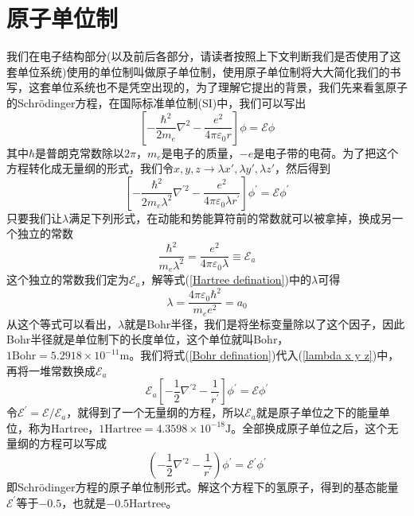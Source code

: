 \documentclass[12pt,a4paper,openany,twoside]{book}
\numberwithin{equation}{section}
\newcommand{\sch}{Schr\"odinger}
\begin{document}
      \section{原子单位制}
        我们在电子结构部分(以及前后各部分，请读者按照上下文判断我们是否使用了这套单位系统)使用的单位制叫做原子单位制，使用原子单位制将大大简化我们的书写，这套单位系统也不是凭空出现的，为了理解它提出的背景，我们先来看氢原子的\sch 方程，在国际标准单位制(SI)中，我们可以写出
        \begin{equation}
          \left[ - \frac { \hbar ^ { 2 } } { 2 m _ { e } } \nabla ^ { 2 } - \frac { e ^ { 2 } } { 4 \pi \varepsilon _ { 0 } r } \right] \phi = \mathscr { E } \phi
        \end{equation}
        其中$\hbar$是普朗克常数除以$2\pi$，$m_e$是电子的质量，$-e$是电子带的电荷。为了把这个方程转化成无量纲的形式，我们令$x,y,z\rightarrow\lambda x',\lambda y',\lambda z'$，然后得到
        \begin{equation}
          \left[ - \frac { \hbar ^ { 2 } } { 2 m _ { e } \lambda ^ { 2 } } \nabla ^ { \prime 2 } - \frac { e ^ { 2 } } { 4 \pi \varepsilon _ { 0 } \lambda r ^ { \prime } } \right] \phi ^ { \prime } = \mathscr { E } \phi ^ { \prime }
          \label{lambda x y z}
        \end{equation}
        只要我们让$\lambda$满足下列形式，在动能和势能算符前的常数就可以被拿掉，换成另一个独立的常数
        \begin{equation}
          \frac { \hbar ^ { 2 } } { m _ { e } \lambda ^ { 2 } } = \frac { e ^ { 2 } } { 4 \pi \varepsilon _ { 0 } \lambda }\equiv \mathscr { E } _ { a }
          \label{Hartree defination}
        \end{equation}
        这个独立的常数我们定为$ \mathscr { E } _ { a }$，解等式(\ref{Hartree defination})中的$\lambda$可得
        \begin{equation}
          \lambda=\frac{4\pi\varepsilon_0\hbar^2}{m_e e^2}=a_0
          \label{Bohr defination}
        \end{equation}
        从这个等式可以看出，$\lambda$就是Bohr半径，我们是将坐标变量除以了这个因子，因此Bohr半径就是单位制下的长度单位，这个单位就叫Bohr，$1 \text{Bohr} = 5.2918 \times 10^{-11} \textrm{m}$。我们将式(\ref{Bohr defination})代入(\ref{lambda x y z})中，再将一堆常数换成$\mathscr{E}_a$
        \begin{equation}
          \mathscr { E } _ { a } \left[ - \frac { 1 } { 2 } \nabla ^ { \prime 2 } - \frac { 1 } { r ^ { \prime } } \right] \phi ^ { \prime } = \mathscr { E } \phi ^ { \prime }
        \end{equation}
        令$\mathscr{E}^{\prime}=\mathscr{E}/\mathscr{E}_a$，就得到了一个无量纲的方程，所以$\mathscr{E}_a$就是原子单位之下的能量单位，称为Hartree，$1 \text{Hartree} = 4.3598 \times 10^{-18} \textrm{J}$。全部换成原子单位之后，这个无量纲的方程可以写成
        \begin{equation}
          \left( - \frac { 1 } { 2 } \nabla ^ { \prime 2 } - \frac { 1 } { r ^ { \prime } } \right) \phi ^ { \prime } = \mathscr { E } ^ { \prime } \phi ^ { \prime }
        \end{equation}
        即\sch 方程的原子单位制形式。解这个方程下的氢原子，得到的基态能量$\mathscr{E}^{\prime}$等于$-0.5$，也就是$-0.5$Hartree。
\end{document}
